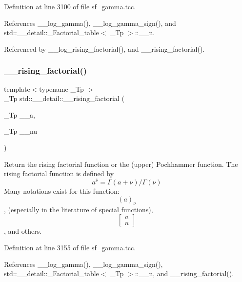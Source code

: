 Definition at line 3100 of file sf\+\_\+gamma.\+tcc.



References \+\_\+\+\_\+log\+\_\+gamma(), \+\_\+\+\_\+log\+\_\+gamma\+\_\+sign(), and std\+::\+\_\+\+\_\+detail\+::\+\_\+\+Factorial\+\_\+table$<$ \+\_\+\+Tp $>$\+::\+\_\+\+\_\+n.



Referenced by \+\_\+\+\_\+log\+\_\+rising\+\_\+factorial(), and \+\_\+\+\_\+rising\+\_\+factorial().

\mbox{\label{namespacestd_1_1____detail_a109a13aa776d60bdc49b1cedc0e77670}} 
\subsubsection{\texorpdfstring{\+\_\+\+\_\+rising\+\_\+factorial()}{\_\_rising\_factorial()}\hspace{0.1cm}{\footnotesize\ttfamily [2/2]}}
{\footnotesize\ttfamily template$<$typename \+\_\+\+Tp $>$ \\
\+\_\+\+Tp std\+::\+\_\+\+\_\+detail\+::\+\_\+\+\_\+rising\+\_\+factorial (\begin{DoxyParamCaption}\item[{\+\_\+\+Tp}]{\+\_\+\+\_\+a,  }\item[{\+\_\+\+Tp}]{\+\_\+\+\_\+nu }\end{DoxyParamCaption})}



Return the rising factorial function or the (upper) Pochhammer function. The rising factorial function is defined by \[ a^{\overline{\nu}} = \Gamma(a + \nu) / \Gamma(\nu) \] Many notations exist for this function\+: \[ (a)_\nu \], (especially in the literature of special functions), \[ \left[ \begin{array}{c} a \\ n \end{array} \right] \], and others. 



Definition at line 3155 of file sf\+\_\+gamma.\+tcc.



References \+\_\+\+\_\+log\+\_\+gamma(), \+\_\+\+\_\+log\+\_\+gamma\+\_\+sign(), std\+::\+\_\+\+\_\+detail\+::\+\_\+\+Factorial\+\_\+table$<$ \+\_\+\+Tp $>$\+::\+\_\+\+\_\+n, and \+\_\+\+\_\+rising\+\_\+factorial().

